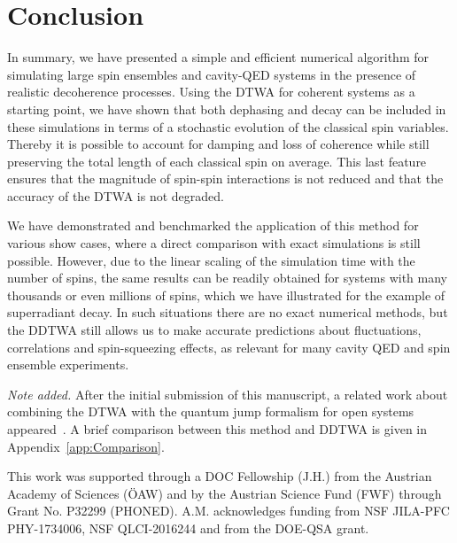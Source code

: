 \documentclass[pra,twocolumn,showpacs,preprintnumbers,amsmath,amssymb,superscriptaddress]{revtex4-1}
\newcommand{\pr}[1]{\textcolor{blue}{#1}}
\begin{document}

\section{Conclusion}\label{sec:conclusion}
In summary, we have presented a simple and efficient numerical algorithm for simulating large spin ensembles and cavity-QED systems in the presence of realistic decoherence processes. Using the DTWA for coherent systems as a starting point, we have shown that both dephasing and decay can be included in these simulations in terms of a stochastic evolution of the classical spin variables. Thereby it is possible to account for damping and loss of coherence while still preserving the total length of each classical spin on average. This last feature ensures that the magnitude of spin-spin interactions is not reduced and that the accuracy of the DTWA is not degraded. 

We have demonstrated and benchmarked the application of this method for various show cases, where a direct comparison with exact simulations is still possible. However, due to the linear scaling of the simulation time with the number of spins, the same results can be readily obtained for systems with many thousands or even millions of spins, which we have illustrated for the example of superradiant decay.  In such situations there are no exact numerical methods, but the DDTWA still allows us to make accurate predictions about fluctuations, correlations and spin-squeezing effects, as relevant for many cavity QED and spin ensemble experiments.  

\emph{Note added.} After the initial submission of this manuscript, a related work about combining the DTWA with the quantum jump formalism for open systems appeared~\cite{Singh2021}. A brief comparison between this method and DDTWA is given in Appendix~\ref{app:Comparison}. 

\acknowledgements
This work was supported through a DOC Fellowship (J.H.) from the Austrian Academy of Sciences (\"OAW) and by the Austrian Science Fund (FWF) through Grant No. P32299 (PHONED). A.M. acknowledges funding from NSF JILA-PFC PHY-1734006, NSF QLCI-2016244 and from the DOE-QSA grant.

\appendix
\end{document}
